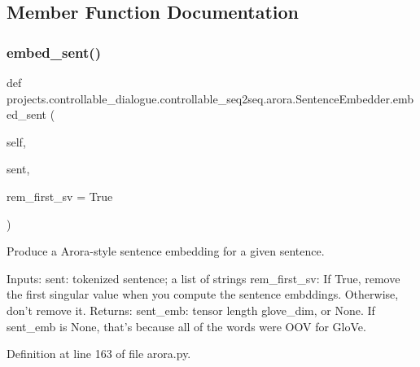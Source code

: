 \subsection{Member Function Documentation}
\mbox{\label{classprojects_1_1controllable__dialogue_1_1controllable__seq2seq_1_1arora_1_1SentenceEmbedder_aea0dbc0848f20665f18c7aabc737ce7f}} 
\subsubsection{\texorpdfstring{embed\+\_\+sent()}{embed\_sent()}}
{\footnotesize\ttfamily def projects.\+controllable\+\_\+dialogue.\+controllable\+\_\+seq2seq.\+arora.\+Sentence\+Embedder.\+embed\+\_\+sent (\begin{DoxyParamCaption}\item[{}]{self,  }\item[{}]{sent,  }\item[{}]{rem\+\_\+first\+\_\+sv = {\ttfamily True} }\end{DoxyParamCaption})}

\begin{DoxyVerb}Produce a Arora-style sentence embedding for a given sentence.

Inputs:
  sent: tokenized sentence; a list of strings
  rem_first_sv: If True, remove the first singular value when you compute the
    sentence embddings. Otherwise, don't remove it.
Returns:
  sent_emb: tensor length glove_dim, or None.
      If sent_emb is None, that's because all of the words were OOV for GloVe.
\end{DoxyVerb}
 

Definition at line 163 of file arora.\+py.


